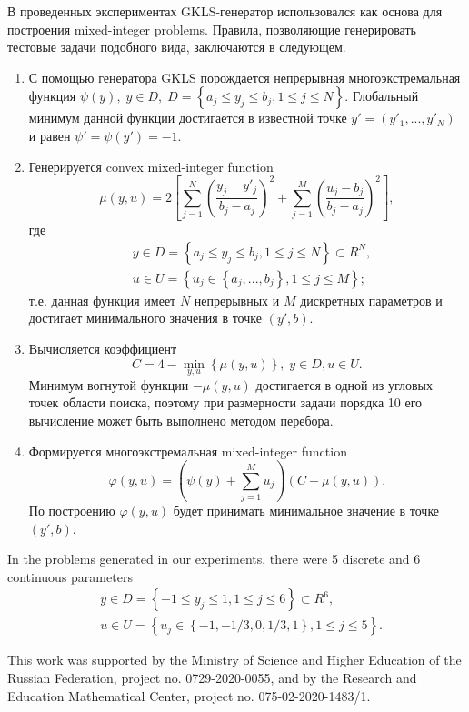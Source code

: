 \documentclass[
11pt,%
tightenlines,%
twoside,%
onecolumn,%
nofloats,%
nobibnotes,%
nofootinbib,%
superscriptaddress,%
noshowpacs,%
centertags]%
{revtex4}
\begin{document}
В проведенных экспериментах GKLS-генератор использовался как основа для построения mixed-integer problems. Правила, позволяющие генерировать тестовые задачи подобного вида, заключаются в следующем.

\begin{enumerate}
	\item С помощью генератора GKLS порождается непрерывная многоэкстремальная функция $\psi(y), \; y\in D, \; D = \left\{ a_j\leq y_j\leq b_j, 1\leq j \leq N \right\}$. Глобальный минимум данной функции достигается в известной точке $y'=(y'_1,...,y'_N)$ и равен $\psi'=\psi(y')=-1$.
	\item Генерируется convex mixed-integer function 
	\[
			\mu(y,u) = 2 \left[ \sum_{j=1}^N \left( \frac{y_j - y'_j}{b_j-a_j} \right)^2 + \sum_{j=1}^M \left( \frac{u_j - b_j}{b_j-a_j} \right)^2 \right],
	\]
	где 
	\begin{eqnarray*}
	& y\in D = \left\{ a_j\leq y_j\leq b_j, 1\leq j \leq N \right\} \subset R^N, \\
	& u\in U = \left\{ u_j \in  \left\{a_j, ..., b_j \right\}, 1\leq j \leq M \right\};
	\end{eqnarray*}
	т.е. данная функция имеет $N$ непрерывных и $M$ дискретных параметров и достигает минимального значения в точке $(y',b)$.
	\item Вычисляется коэффициент 
	\[
	C = 4 - \min_{y,u} \left\{ \mu(y,u) \right\}, \; y\in D, u \in U.
	\]
	Минимум вогнутой функции $-\mu(y,u)$ достигается в одной из угловых точек области поиска, поэтому при размерности задачи порядка 10 его вычисление может быть выполнено методом перебора.
	\item Формируется многоэкстремальная mixed-integer function 
	\[
	\varphi(y,u) = \left(\psi(y) + \sum_{j=1}^M{u_j}\right)\left(C - \mu(y,u)\right).
	\]
	По построению $\varphi(y,u)$  будет принимать минимальное значение в точке $(y',b)$.
	
\end{enumerate}


In the problems generated in our experiments, there were 5 discrete and 6 continuous parameters 
	\begin{eqnarray*}
	& y\in D = \left\{ -1 \leq y_j\leq 1, 1\leq j \leq 6 \right\} \subset R^6, \\
	& u\in U = \left\{ u_j \in  \left\{-1, -1/3, 0, 1/3, 1 \right\}, 1\leq j \leq 5 \right\}.
	\end{eqnarray*}




\begin{acknowledgments}
This work was supported by the Ministry of Science and Higher Education of the Russian Federation, project no. 0729-2020-0055, and by the Research and Education Mathematical Center, project no. 075-02-2020-1483/1.
\end{acknowledgments}
\end{document}
